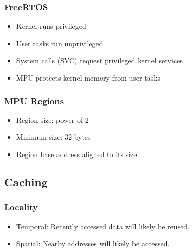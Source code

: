   \begin{minipage}[t]{0.38\linewidth}
    \subsubsection{FreeRTOS}
    \begin{itemize}
      \item Kernel runs privileged
      \item User tasks run unprivileged
      \item System calls (SVC) request privileged kernel services
      \item MPU protects kernel memory from user tasks
    \end{itemize}

    \subsubsection{MPU Regions}
    \begin{itemize}
      \item Region size: power of 2
      \item Minimum size: 32 bytes
      \item Region base address aligned to its size
    \end{itemize}
  \end{minipage}

\subsection{Caching}
  \subsubsection{Locality}
      \begin{itemize}
        \item Temporal: Recently accessed data will likely be reused.
        \item Spatial: Nearby addresses will likely be accessed.
      \end{itemize}

